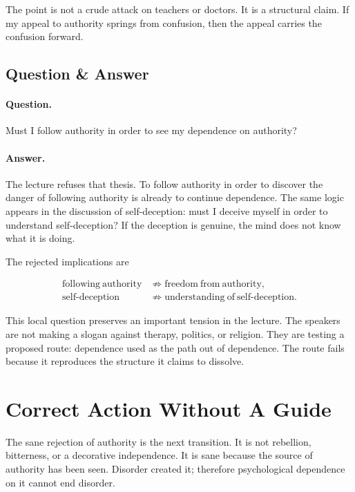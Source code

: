 The point is not a crude attack on teachers or doctors. It is a structural claim. If my appeal to authority springs from confusion, then the appeal carries the confusion forward.

\subsection{Question \& Answer}

\paragraph{Question.}
Must I follow authority in order to see my dependence on authority?

\paragraph{Answer.}
The lecture refuses that thesis. To follow authority in order to discover the danger of following authority is already to continue dependence. The same logic appears in the discussion of self-deception: must I deceive myself in order to understand self-deception? If the deception is genuine, the mind does not know what it is doing.

The rejected implications are

\begin{align}
\mathrm{following\ authority}
&\not\Rightarrow
\mathrm{freedom\ from\ authority},\\
\mathrm{self\mbox{-}deception}
&\not\Rightarrow
\mathrm{understanding\ of\ self\mbox{-}deception}.
\end{align}

This local question preserves an important tension in the lecture. The speakers are not making a slogan against therapy, politics, or religion. They are testing a proposed route: dependence used as the path out of dependence. The route fails because it reproduces the structure it claims to dissolve.

\section{Correct Action Without A Guide}

The sane rejection of authority is the next transition. It is not rebellion, bitterness, or a decorative independence. It is sane because the source of authority has been seen. Disorder created it; therefore psychological dependence on it cannot end disorder.

